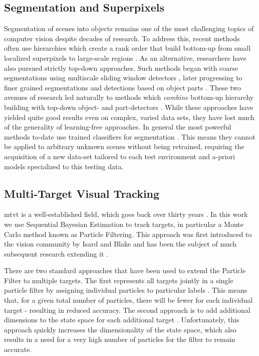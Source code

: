 \subsection{Segmentation and Superpixels}
Segmentation of scenes into objects remains one of the most challenging topics of computer vision despite decades of research. To address this, recent methods often use hierarchies which create a rank order that build bottom-up from small localized superpixels to large-scale regions \cite{Ren:ICCV2003,Ahuja:CVPR2008,Arbelaez:PAMI2011}. As an alternative, researchers have also pursued strictly top-down approaches. Such methods began with coarse segmentations using multiscale sliding window detectors \cite{ViolaJones:IJCV2004}, later progressing to finer grained segmentations and detections based on object parts \cite{Felzenswalb:PAMI2010, Bourdev:ICCV2009}. These two avenues of research led naturally to methods which {\em combine} bottom-up hierarchy building with top-down object- and part-detectors \cite{Arbelaez:CVPR2012, Silberman:ECCV12, Gupta:CVPR2013}. While these approaches have yielded quite good results even on complex, varied data sets, they have lost much of the generality of learning-free approaches. In general the most powerful methods to-date use trained classifiers for segmentation \cite{Silberman:ECCV12, Gupta:CVPR2013}. This means they cannot be applied to arbitrary unknown scenes without being retrained, requiring the acquisition of a new data-set tailored to each test environment and a-priori models specialized to this testing data.

\subsection{Multi-Target Visual Tracking}
\gls{mtvt} is a well-established field, which goes back over thirty years \cite{MTT_JPDA}. In this work we use  Sequential Bayesian Estimation to track targets, in particular a Monte Carlo method known as Particle Filtering. This approach was first introduced to the vision community by Isard and Blake \cite{Condensation98} and has been the subject of much subsequent research extending it \cite{TrackingMultipleParticleFiltering,MonteCarloMTT,SequentialMonteCarloMultitargetFiltering}.

There are two standard approaches that have been used to extend the Particle Filter to multiple targets. The first represents all targets jointly in a single particle filter by assigning individual particles to particular labels \cite{MultiMixtureTracking03}. This means that, for a given total number of particles, there will be fewer for each individual target - resulting in reduced accuracy. The second approach is to add additional dimensions to the state space for each additional target \cite{TrackMultTargets01}. Unfortunately, this approach quickly increases the dimensionality of the state space, which also results in a need for a very high number of particles for the filter to remain accurate. 

